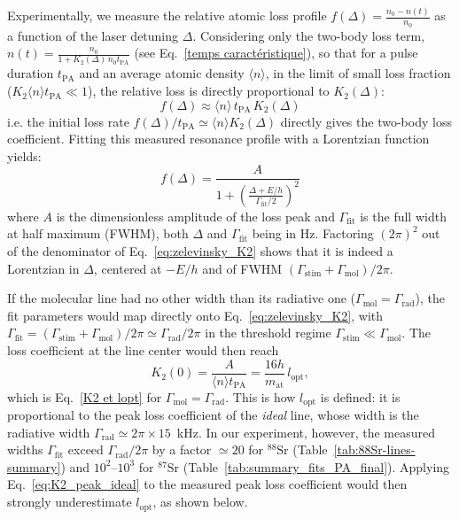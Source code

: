Experimentally, we measure the relative atomic loss profile
$f(\Delta) = \frac{n_0 - n(t)}{n_0}$ as a function of the laser detuning $\Delta$.
Considering only the two-body loss term, $n(t) = \frac{n_0}{1+K_2(\Delta)\,n_0 t_{\text{PA}}}$
(see Eq.~\ref{temps caractéristique}), so that for a pulse duration $t_{\text{PA}}$
and an average atomic density $\langle n \rangle$, in the limit of small loss
fraction ($K_2 \langle n \rangle t_{\text{PA}} \ll 1$), the relative loss is
directly proportional to $K_2(\Delta)$:
\begin{equation}
    f(\Delta) \approx \langle n \rangle \, t_{\text{PA}} \, K_2(\Delta)
\end{equation}
i.e. the initial loss rate $f(\Delta)/t_{\text{PA}} \simeq \langle n\rangle K_2(\Delta)$ directly gives the
two-body loss coefficient.
Fitting this measured resonance profile with a Lorentzian function yields:
\begin{equation}
    f(\Delta) = \frac{A}{1 + \left( \frac{\Delta + E/h}{\Gamma_{\text{fit}}/2} \right)^2}
\label{eq:lorentzian_fit_standard}
\end{equation}
where $A$ is the dimensionless amplitude of the loss peak and $\Gamma_{\text{fit}}$
is the full width at half maximum (FWHM), both $\Delta$ and $\Gamma_{\text{fit}}$ being in Hz.
Factoring $(2\pi)^2$ out of the denominator of Eq.~\ref{eq:zelevinsky_K2} shows that it is
indeed a Lorentzian in $\Delta$, centered at $-E/h$ and of FWHM
$(\Gamma_{\text{stim}}+\Gamma_{\text{mol}})/2\pi$.

If the molecular line had no other width than its radiative one ($\Gamma_{\text{mol}}=\Gamma_{\text{rad}}$), the fit parameters would map
directly onto Eq.~\ref{eq:zelevinsky_K2}, with
$\Gamma_{\text{fit}} = (\Gamma_{\text{stim}} + \Gamma_{\text{mol}})/2\pi \simeq \Gamma_{\text{rad}}/2\pi$
in the threshold regime $\Gamma_{\text{stim}} \ll \Gamma_{\text{mol}}$. The loss
coefficient at the line center would then reach
\begin{equation}
    K_2(0) = \frac{A}{\langle n\rangle t_{\text{PA}}} = \frac{16h}{m_{\text{at}}}\,l_{\text{opt}},
    \label{eq:K2_peak_ideal}
\end{equation}
which is Eq.~\ref{K2 et lopt} for $\Gamma_{\text{mol}}=\Gamma_{\text{rad}}$. This is how $l_{\text{opt}}$ is defined: it is
proportional to the peak loss coefficient of the \textit{ideal} line, whose width is
the radiative width $\Gamma_{\text{rad}} \simeq 2\pi\times15$~kHz. In our
experiment, however, the measured widths $\Gamma_{\text{fit}}$ exceed
$\Gamma_{\text{rad}}/2\pi$ by a factor $\simeq20$ for $^{88}\text{Sr}$
(Table~\ref{tab:88Sr-lines-summary}) and $10^2$--$10^3$ for $^{87}\text{Sr}$
(Table~\ref{tab:summary_fits_PA_final}). Applying Eq.~\ref{eq:K2_peak_ideal} to the
measured peak loss coefficient would then strongly underestimate $l_{\text{opt}}$,
as shown below.

